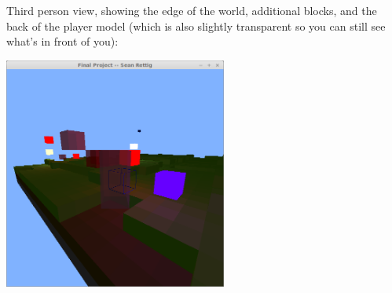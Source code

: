 \documentclass[12pt]{article}
\begin{document}
Third person view, showing the edge of the world, additional blocks, and the
back of the player model (which is also slightly transparent so you can still
see what's in front of you):

\includegraphics[width=0.55\textwidth]{screenshot2.png}
\end{document}
